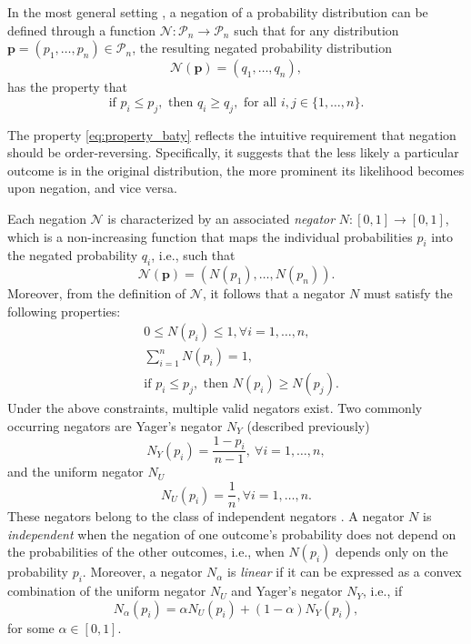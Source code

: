 \documentclass[pdflatex,sn-basic,iicol]{sn-jnl}%
\theoremstyle{thmstyleone}%
\theoremstyle{thmstyletwo}%
\theoremstyle{thmstylethree}%
\newcommand{\N}{\mathcal{N}}
\newcommand{\cP}{\mathcal{P}}
\newcommand{\bp}{\mathbf{p}}
\begin{document}
{In the most general setting \citep{generating}, 
a negation of a probability distribution can be defined through  a function $\N:\cP_n \to \cP_n$ such that for any distribution $\bp = (p_1,\ldots,p_n) \in \cP_n$, the resulting 
 negated probability distribution 
\begin{equation}
    \N(\bp)=(q_1,\ldots,q_n),
\end{equation}
has the property that  
\begin{equation}\label{eq:property_baty}
    \text{if } p_i\leq p_j, \text{ then } q_i \geq q_j,  \mbox{ for all } 
    i,j\in \{1,\dots,n\}.
\end{equation}

The property  \eqref{eq:property_baty} reflects the intuitive requirement that negation should be order-reversing. Specifically, it suggests that the less likely a particular outcome is in the original distribution, the more prominent its likelihood becomes upon negation, and vice versa.

Each negation $\N$ is characterized by an associated \textit{negator} $N:[0,1]\to[0,1]$, which is a non-increasing function that maps the individual probabilities $p_i$ into the negated probability $q_i$, i.e., such that
$$\N(\bp)=(N(p_1), \ldots, N(p_n)).$$
 Moreover, from the definition of $\N$, it follows that a negator $N$ must satisfy the following properties:
\begin{align}
    &0 \leq N(p_i) \leq 1, \forall i=1,\dots,n,\\
    &\sum_{i=1}^n N(p_i)=1,\\
    &\text{if } p_i\leq p_j, \text{ then } N(p_i) \geq N(p_j). \label{mon}
\end{align}
Under the above constraints, multiple valid negators exist. Two commonly occurring negators are Yager's negator $N_Y$ (described previously)
\begin{equation}\label{defY}
    N_Y(p_i) = \frac{1-p_i}{n-1}, \ \forall i=1,\dots,n,
\end{equation}
and the uniform negator $N_U$ 
\begin{equation}\label{defU}
    N_U(p_i) = \frac{1}{n}, \forall i=1,\dots,n.
\end{equation}
These negators belong to the class of independent negators \citep{generating}.
A negator $N$ is \textit{independent} when the negation of one outcome’s probability does not depend on the probabilities of the other outcomes, i.e., when $N(p_i)$ depends only on the probability $p_i$. Moreover, a negator $N_\alpha$ is \textit{linear} if it can be expressed as a convex combination of the uniform negator $N_U$ and Yager's negator $N_Y$, i.e., if
$$N_\alpha(p_i)=\alpha N_U(p_i) + (1-\alpha)N_Y(p_i),$$ 
for some $\alpha\in[0,1]$.


}
\end{document}
